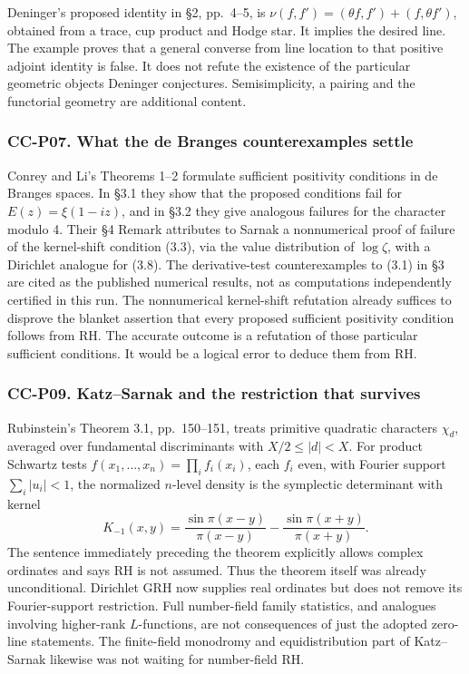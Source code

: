 \documentclass[11pt,a4paper]{article}
\theoremstyle{definition}\newtheorem{definition}[theorem]{Definition}
\theoremstyle{remark}\newtheorem{remark}[theorem]{Remark}
\begin{document}
Deninger's proposed identity in §2, pp.~4--5, is
\(\nu(f,f')=(\theta f,f')+(f,\theta f')\), obtained from a trace, cup
product and Hodge star. It implies the desired line. The example proves
that a general converse from line location to that positive adjoint
identity is false. It does not refute the existence of the particular
geometric objects Deninger conjectures. Semisimplicity, a pairing and
the functorial geometry are additional content.

\subsubsection{CC-P07. What the de Branges counterexamples
settle}\label{cc-p07.-what-the-de-branges-counterexamples-settle}

Conrey and Li's Theorems 1--2 formulate sufficient positivity conditions
in de Branges spaces. In §3.1 they show that the proposed conditions
fail for \(E(z)=\xi(1-iz)\), and in §3.2 they give analogous failures
for the character modulo 4. Their §4 Remark attributes to Sarnak a
nonnumerical proof of failure of the kernel-shift condition (3.3), via
the value distribution of \(\log\zeta\), with a Dirichlet analogue for
(3.8). The derivative-test counterexamples to (3.1) in §3 are cited as
the published numerical results, not as computations independently
certified in this run. The nonnumerical kernel-shift refutation already
suffices to disprove the blanket assertion that every proposed
sufficient positivity condition follows from RH. The accurate outcome is
a refutation of those particular sufficient conditions. It would be a
logical error to deduce them from RH.

\subsubsection{CC-P09. Katz--Sarnak and the restriction that
survives}\label{cc-p09.-katzsarnak-and-the-restriction-that-survives}

Rubinstein's Theorem 3.1, pp.~150--151, treats primitive quadratic
characters \(\chi_d\), averaged over fundamental discriminants with
\(X/2\le|d|<X\). For product Schwartz tests
\(f(x_1,\ldots,x_n)=\prod_i f_i(x_i)\), each \(f_i\) even, with Fourier
support \(\sum_i|u_i|<1\), the normalized \(n\)-level density is the
symplectic determinant with kernel \[
 K_{-1}(x,y)=\frac{\sin\pi(x-y)}{\pi(x-y)}
            -\frac{\sin\pi(x+y)}{\pi(x+y)}.
\] The sentence immediately preceding the theorem explicitly allows
complex ordinates and says RH is not assumed. Thus the theorem itself
was already unconditional. Dirichlet GRH now supplies real ordinates but
does not remove its Fourier-support restriction. Full number-field
family statistics, and analogues involving higher-rank \(L\)-functions,
are not consequences of just the adopted zero-line statements. The
finite-field monodromy and equidistribution part of Katz--Sarnak
likewise was not waiting for number-field RH.
\end{document}
